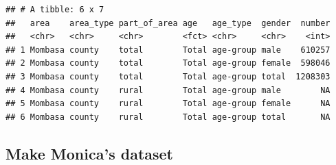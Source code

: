 \documentclass[
]{book}
\newenvironment{Shaded}{\begin{snugshade}}{\end{snugshade}}
\newcommand{\DataTypeTok}[1]{\textcolor[rgb]{0.13,0.29,0.53}{#1}}
\newcommand{\KeywordTok}[1]{\textcolor[rgb]{0.13,0.29,0.53}{\textbf{#1}}}
\newcommand{\NormalTok}[1]{#1}
\newcommand{\OperatorTok}[1]{\textcolor[rgb]{0.81,0.36,0.00}{\textbf{#1}}}
\newcommand{\StringTok}[1]{\textcolor[rgb]{0.31,0.60,0.02}{#1}}
\begin{document}
\begin{Shaded}
\end{Shaded}

\begin{verbatim}
## # A tibble: 6 x 7
##   area    area_type part_of_area age   age_type  gender  number
##   <chr>   <chr>     <chr>        <fct> <chr>     <chr>    <int>
## 1 Mombasa county    total        Total age-group male    610257
## 2 Mombasa county    total        Total age-group female  598046
## 3 Mombasa county    total        Total age-group total  1208303
## 4 Mombasa county    rural        Total age-group male        NA
## 5 Mombasa county    rural        Total age-group female      NA
## 6 Mombasa county    rural        Total age-group total       NA
\end{verbatim}

\hypertarget{make-monicas-dataset}{%
\subsection{Make Monica's dataset}\label{make-monicas-dataset}}
\end{document}
